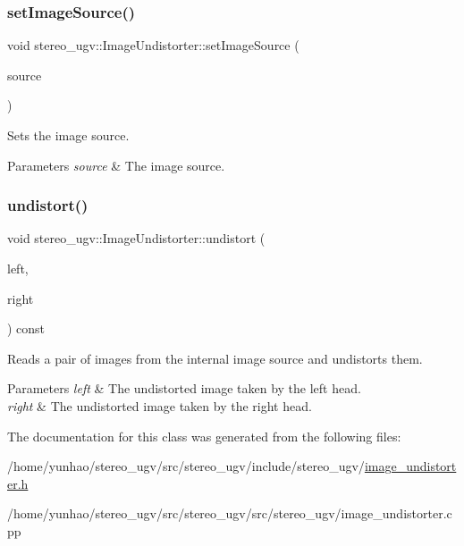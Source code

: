 \subsubsection{\texorpdfstring{set\+Image\+Source()}{setImageSource()}}
{\footnotesize\ttfamily void stereo\+\_\+ugv\+::\+Image\+Undistorter\+::set\+Image\+Source (\begin{DoxyParamCaption}\item[{std\+::unique\+\_\+ptr$<$ \hyperlink{classstereo__ugv_1_1ImageSource}{Image\+Source} $>$ \&\&}]{source }\end{DoxyParamCaption})}



Sets the image source. 


\begin{DoxyParams}{Parameters}
{\em source} & The image source. \\
\hline
\end{DoxyParams}
\mbox{\label{classstereo__ugv_1_1ImageUndistorter_ac5d966202bb27b1590f44527bbf05394}} 
\subsubsection{\texorpdfstring{undistort()}{undistort()}}
{\footnotesize\ttfamily void stereo\+\_\+ugv\+::\+Image\+Undistorter\+::undistort (\begin{DoxyParamCaption}\item[{cv\+::cuda\+::\+Gpu\+Mat $\ast$}]{left,  }\item[{cv\+::cuda\+::\+Gpu\+Mat $\ast$}]{right }\end{DoxyParamCaption}) const}



Reads a pair of images from the internal image source and undistorts them. 


\begin{DoxyParams}{Parameters}
{\em left} & The undistorted image taken by the left head. \\
\hline
{\em right} & The undistorted image taken by the right head. \\
\hline
\end{DoxyParams}


The documentation for this class was generated from the following files\+:\begin{DoxyCompactItemize}
\item 
/home/yunhao/stereo\+\_\+ugv/src/stereo\+\_\+ugv/include/stereo\+\_\+ugv/\hyperlink{image__undistorter_8h}{image\+\_\+undistorter.\+h}\item 
/home/yunhao/stereo\+\_\+ugv/src/stereo\+\_\+ugv/src/stereo\+\_\+ugv/image\+\_\+undistorter.\+cpp\end{DoxyCompactItemize}
